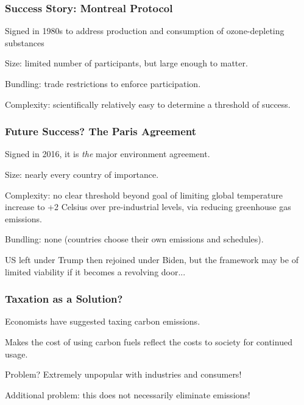\documentclass{beamer}
\begin{document}
\begin{frame} 
	\frametitle{\LARGE{Success Story: Montreal Protocol}}
	\begin{itemize}
		\large{
			\item Signed in 1980s to address production and consumption of ozone-depleting substances \pause
			
			\item Size: limited number of participants, but large enough to matter. \pause
			
			\item Bundling: trade restrictions to enforce participation. \pause
			
			\item Complexity: scientifically relatively easy to determine a threshold of success.
		}
	\end{itemize}
\end{frame}

\begin{frame} 
	\frametitle{\LARGE{Future Success? The Paris Agreement}}
	\begin{itemize}
		\large{
			\item Signed in 2016, it is \textit{the} major environment agreement. \pause
			
			\item Size: nearly every country of importance. \pause
			
			\item Complexity: no clear threshold beyond goal of limiting global temperature increase to +2 Celsius over pre-industrial levels, via reducing greenhouse gas emissions. \pause 
			
			\item Bundling: none (countries choose their own emissions and schedules). \pause 
			
			\item US left under Trump then rejoined under Biden, but the framework may be of limited viability if it becomes a revolving door...
			
		}
	\end{itemize}
\end{frame}


\begin{frame} 
	\frametitle{\LARGE{Taxation as a Solution?}}
	\begin{itemize}
		\large{\pause
			\item Economists have suggested taxing carbon emissions. \pause
			
			\item Makes the cost of using carbon fuels reflect the costs to society for continued usage. \pause
			
			\item Problem? \pause Extremely unpopular with industries and consumers! \pause
			\item Additional problem: this does not necessarily eliminate emissions!
		}
	\end{itemize}
\end{frame}
\end{document}
